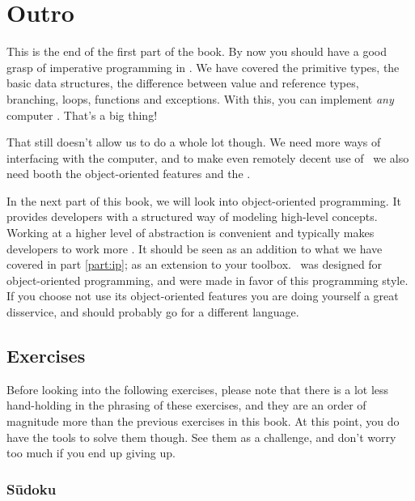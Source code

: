 \chapter{Outro}

This is the end of the first part of the book. By now you should have a good grasp of imperative programming in \csharp. We have covered the primitive types, the basic data structures, the difference between value and reference types, branching, loops, functions and exceptions. With this, you can implement \textsl{any} computer . That's a big thing!

That still doesn't allow us to do a whole lot though. We need more ways of interfacing with the computer, and to make even remotely decent use of \csharp\ we also need booth the object-oriented features and the .

In the next part of this book, we will look into object-oriented programming. It provides developers with a structured way of modeling high-level concepts. Working at a higher level of abstraction is convenient and typically makes developers to work more . It should be seen as an addition to what we have covered in part \ref{part:ip}; as an extension to your toolbox. \csharp\ was designed for object-oriented programming, and  were made in favor of this programming style. If you choose not use its object-oriented features you are doing yourself a great disservice, and should probably go for a different language.

\section{Exercises}

Before looking into the following exercises, please note that there is a lot less hand-holding in the phrasing of these exercises, and they are an order of magnitude more  than the previous exercises in this book. At this point, you do have the tools to solve them though. See them as a challenge, and don't worry too much if you end up giving up.

\subsection{Sūdoku}

